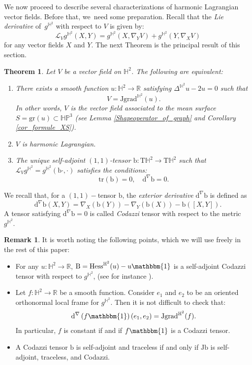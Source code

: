\documentclass[10pt]{amsart}
\theoremstyle{plain}
\newtheorem{theorem}[cor]{Theorem}
\theoremstyle{definition}
\newtheorem{remark}[cor]{Remark}
\newcommand{\bb}{\mathrm{b}}
\newcommand{\HP}{\mathbb{HP}^3}
\newcommand{\grad}{\mathrm{grad}^{\mathbb{H}^2}}
\newcommand{\hess}{\mathrm{Hess}^{\mathbb{H}^2}}
\newcommand{\J}{\mathrm{J}}
\newcommand{\B}{\mathrm{B}}
\begin{document}
We now proceed to describe several characterizations of harmonic Lagrangian vector fields. Before that, we~need some preparation.
Recall that the \emph{Lie derivative} of~$g^{\mathbb{H}^2}$ with respect to $V$ is given by:
\[
\mathcal{L}_Vg^{\mathbb{H}^2}(X,Y)=g^{\mathbb{H}^2}(X,\nabla_YV)+g^{\mathbb{H}^2}(Y,\nabla_X V)
\]
for any vector fields $X$ and $Y$.
The next Theorem is the principal result of this section.
\begin{theorem}\label{charac_HL}
Let $V$ be a vector field on $\mathbb{H}^2$. The following are equivalent:
\begin{enumerate}
\item \label{charac_HL1} There exists a smooth function $u:\mathbb{H}^2\to\mathbb{R}$ satisfying $\Delta^{\mathbb{H}^2} u-2u=0$ such that
\[
V=\J\grad(u).
\]
In other words, $V$ is the vector field associated to the mean surface $S=\mathrm{gr}(u)\subset\HP$ (see Lemma \ref{Shapeoperator_of_graph} and Corollary \ref{cor_formule_XS}).
\item \label{charac_HL2} $V$ is harmonic Lagrangian.
\item \label{charac_HL3} The unique self-adjoint $(1, 1)$-tensor $\bb:\mathrm{T}\mathbb{H}^2\to \mathrm{T}\mathbb{H}^2$ such that $\mathcal{L}_Vg^{\mathbb{H}^2}=g^{\mathbb{H}^2}(\bb\cdot,\cdot)$ satisfies the conditions:\begin{equation}\label{condition_harmonic_lagrangian}
\mathrm{tr}(\bb)=0,\quad \mathrm{d}^{\nabla}\bb=0.
\end{equation}
\end{enumerate}
\end{theorem}
We recall that, for a $(1,1)-$tensor $\bb$, the \emph{exterior derivative} $\mathrm{d}^{\nabla}\bb$ is defined as
\[
\mathrm{d}^{\nabla}\bb(X,Y) = \nabla_X(\bb(Y)) -\nabla_Y(\bb(X))-\bb([X, Y]).
\]
A tensor satisfying $\mathrm{d}^{\nabla}\bb=0$ is called \emph{Codazzi} tensor with respect to the metric $g^{\mathbb{H}^2}$.
\begin{remark}\label{remark_on_codazzi}
It is worth noting the following points, which we will use freely in the rest of this paper:
\begin{itemize}
\item For any $u:\mathbb{H}^2\to\mathbb{R}$, $\B=\hess(u)-u\mathbbm{1}$ is a self-adjoint Codazzi tensor with respect to $g^{\mathbb{H}^2}$, (see for instance \cite[Lem.\,2.1]{BS_flat_conical}).
\item Let $f:\mathbb{H}^2\to\mathbb{R}$ be a smooth function. Consider $e_1$ and $e_2$ to be an oriented orthonormal local frame
for $g^{\mathbb{H}^2}$. Then it is not difficult to check that:
\[
\mathrm{d}^{\nabla}\left(f\mathbbm{1} \right)(e_1,e_2)=\J\grad(f).
\]
In particular, $f$ is constant if and if $f\mathbbm{1}$ is a Codazzi tensor.

\item A Codazzi tensor $\bb$ is self-adjoint and traceless if and only if $\J\bb$ is self-adjoint, traceless, and Codazzi.
\end{itemize}
\end{remark}
\end{document}
